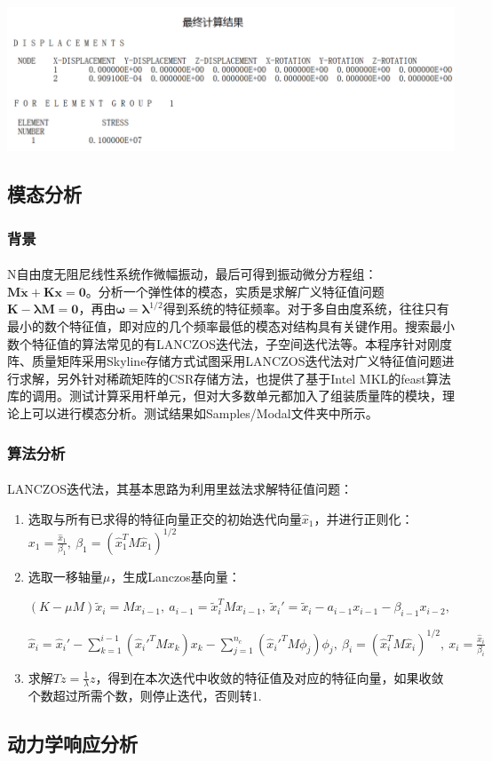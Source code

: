 \documentclass[UTF8]{ctexbook}
\begin{document}
\begin{center}
\includegraphics[width=1.0\textwidth]{plastic6.png}
\end{center}
\subsection{模态分析}
\subsubsection{背景}
\paragraph{}
N自由度无阻尼线性系统作微幅振动，最后可得到振动微分方程组：$\boldsymbol{M\ddot x+Kx=0}$。分析一个弹性体的模态，实质是求解广义特征值问题$\boldsymbol{K-\lambda M=0}$，再由$\boldsymbol{\omega =\lambda}^{1/2}$得到系统的特征频率。对于多自由度系统，往往只有最小的数个特征值，即对应的几个频率最低的模态对结构具有关键作用。搜索最小数个特征值的算法常见的有LANCZOS迭代法，子空间迭代法等。本程序针对刚度阵、质量矩阵采用Skyline存储方式试图采用LANCZOS迭代法对广义特征值问题进行求解，另外针对稀疏矩阵的CSR存储方法，也提供了基于Intel MKL的feast算法库的调用。测试计算采用杆单元，但对大多数单元都加入了组装质量阵的模块，理论上可以进行模态分析。测试结果如Samples/Modal文件夹中所示。
\subsubsection{算法分析}
\paragraph{}
LANCZOS迭代法，其基本思路为利用里兹法求解特征值问题：
\begin{enumerate}
\item 选取与所有已求得的特征向量正交的初始迭代向量$\hat{x}_{1}$，并进行正则化：$x_{1}=\frac{\hat{x}_{1}}{\beta_{1}},\ \beta_{1}=(\hat{x}_{1}^{T}M\hat{x}_{1})^{1/2}$
\item 选取一移轴量$\mu$，生成Lanczos基向量：


$(K-\mu M)\widetilde{x}_{i}=Mx_{i-1},\ a_{i-1}=\widetilde{x}_{i}^{T}Mx_{i-1},\ \widetilde{x}_{i}'=\widetilde{x}_{i}-a_{i-1}x_{i-1}-\beta_{i-1}x_{i-2},$


$\hat{x}_{i}=\hat{x}_{i}'-\sum_{k=1}^{i-1}(\hat{x}_{i}'^{T}Mx_{k})x_{k}-\sum_{j=1}^{n_{c}}(\hat{x}_{i}'^{T}M\phi_{j})\phi_{j},\ \beta_{i}=(\hat{x}_{i}^{T}M\hat{x}_{i})^{1/2},\ x_{i}=\frac{\hat{x}_{i}}{\beta_{i}}$

\item 求解$Tz=\frac{1}{\lambda}z$，得到在本次迭代中收敛的特征值及对应的特征向量，如果收敛个数超过所需个数，则停止迭代，否则转1.\end{enumerate}


\subsection{动力学响应分析}
\end{document}
